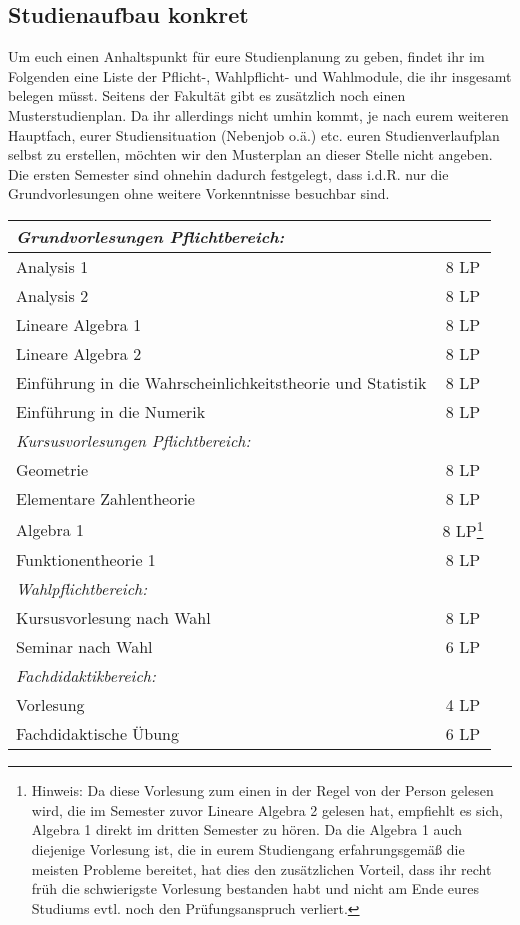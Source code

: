 \subsection{Studienaufbau konkret}

Um euch einen Anhaltspunkt für eure Studienplanung zu geben, findet ihr im Folgenden eine Liste der Pflicht-, Wahlpflicht- und Wahlmodule, die ihr insgesamt belegen müsst. Seitens der Fakultät gibt es zusätzlich noch einen Musterstudienplan. Da ihr allerdings nicht umhin kommt, je nach eurem weiteren Hauptfach, eurer Studiensituation (Nebenjob o.ä.) etc. euren Studienverlaufplan selbst zu erstellen, möchten wir den Musterplan an dieser Stelle nicht angeben. Die ersten Semester sind ohnehin dadurch festgelegt, dass i.d.R. nur die Grundvorlesungen ohne weitere Vorkenntnisse besuchbar sind.\\

\vfill
\begin{figure}[h]
\end{figure}
\vfill
\newpage%

\begin{tabular}{lc}
  \toprule
  \emph{Grundvorlesungen Pflichtbereich:}\\
  \midrule
  Analysis 1 & 8 LP\\
  Analysis 2 & 8 LP\\
  \addlinespace
  Lineare Algebra 1 & 8 LP\\
  Lineare Algebra 2 & 8 LP\\
  \addlinespace
  Einführung in die Wahrscheinlichkeitstheorie und Statistik & 8 LP\\
  Einführung in die Numerik & 8 LP\\[4mm]

  \emph{Kursusvorlesungen Pflichtbereich:}\\
  \midrule
  Geometrie & 8 LP\\
  Elementare Zahlentheorie & 8 LP\\
  Algebra 1 & 8 LP\footnote{Hinweis: Da diese Vorlesung zum einen in der Regel von der Person gelesen wird, die im Semester zuvor Lineare Algebra 2 gelesen hat, empfiehlt es sich, Algebra 1 direkt im dritten Semester zu hören. Da die Algebra 1 auch diejenige Vorlesung ist, die in eurem Studiengang erfahrungsgemäß die meisten Probleme bereitet, hat dies den zusätzlichen Vorteil, dass ihr recht früh die schwierigste Vorlesung bestanden habt und nicht am Ende eures Studiums evtl. noch den Prüfungsanspruch verliert.}\\
  Funktionentheorie 1 & 8 LP\\[4mm]

  \emph{Wahlpflichtbereich:}\\
  \midrule
  Kursusvorlesung nach Wahl & 8 LP\\
  Seminar nach Wahl & 6 LP\\[4mm]

  \emph{Fachdidaktikbereich:}\\
  \midrule
  Vorlesung & 4 LP\\
  Fachdidaktische Übung & 6 LP\\
  \bottomrule
\end{tabular}
